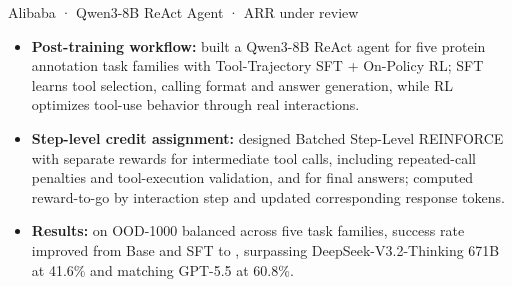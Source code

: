 \projectspace
{}
{Alibaba · Qwen3-8B ReAct Agent · ARR under review}
\begin{itemize}
  \item \textbf{Post-training workflow:} built a Qwen3-8B ReAct agent for five protein annotation task families with Tool-Trajectory SFT + On-Policy RL; SFT learns tool selection, calling format and answer generation, while RL optimizes tool-use behavior through real interactions.
  \item \textbf{Step-level credit assignment:} designed Batched Step-Level REINFORCE with separate rewards for intermediate tool calls, including repeated-call penalties and tool-execution validation, and for final answers; computed reward-to-go by interaction step and updated corresponding response tokens.
  \item \textbf{Results:} on OOD-1000 balanced across five task families, success rate improved from Base  and SFT  to , surpassing DeepSeek-V3.2-Thinking 671B at 41.6\% and matching GPT-5.5 at 60.8\%.
\end{itemize}
